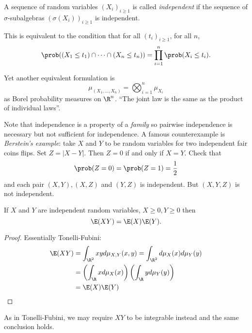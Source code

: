 \documentclass[a4paper]{article}
\renewcommand{\P}{\prob} %
\begin{document}
\begin{definition}[independence]
  A sequence of random variables \((X_i)_{i \geq 1}\) is called \emph{independent} if the sequence of \(\sigma\)-subalgebras \((\sigma(X_i))_{i \geq 1}\) is independent.
\end{definition}

\begin{remark}
  This is equivalent to the condition that for all \((t_i)_{i \geq 1}\), for all \(n\),
  \[
    \P((X_1 \leq t_1) \cap \dots \cap (X_n \leq t_n)) = \prod_{i = 1}^n \P(X_i \leq t_i).
  \]

  Yet another equivalent formulation is
  \[
    \mu_{(X_1, \dots, X_n)} = \bigotimes_{i = 1}^n \mu_{X_i}
  \]
  as Borel probability measures on \(\R^n\). ``The joint law is the same as the product of individual laws''.
\end{remark}

\begin{note}
  Note that independence is a property of a \emph{family} so pairwise independence is necessary but not sufficient for independence. A famous counterexample is \emph{Berstein's example}: take \(X\) and \(Y\) to be random variables for two independent fair coins flips. Set \(Z = |X - Y|\). Then \(Z = 0\) if and only if \(X = Y\). Check that
  \[
    \P(Z = 0) = \P(Z = 1) = \frac{1}{2}
  \]
  and each pair \((X, Y), (X, Z)\) and \((Y, Z)\) is independent. But \((X, Y, Z)\) is not independent.
\end{note}

\begin{proposition}
  If \(X\) and \(Y\) are independent random variables, \(X \geq 0, Y \geq 0\) then
  \[
    \E(XY) = \E(X) \E(Y).
  \]
\end{proposition}

\begin{proof}
  Essentially Tonelli-Fubini:
  \begin{align*}
    \E(XY) &= \int_{\R^2} xy d\mu_{X, Y} (x, y) = \int_{\R^2} d \mu_X(x) d \mu_Y(y) \\
           &= \left(\int_\R x d \mu_X(x) \right) \left(\int_\R y d \mu_Y(y) \right) \\
           &= \E(X) \E(Y)
  \end{align*}
\end{proof}

\begin{remark}
  As in Tonelli-Fubini, we may require \(XY\) to be integrable instead and the same conclusion holds.
\end{remark}
\end{document}
